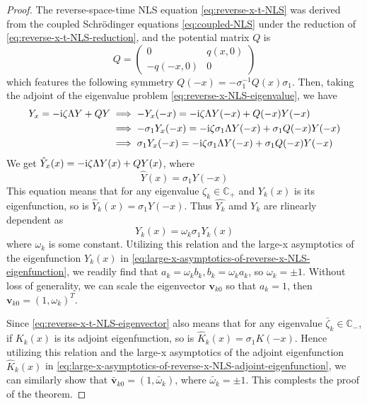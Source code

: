 \begin{proof}
    The reverse-space-time NLS equation \eqref{eq:reverse-x-t-NLS} was derived from the coupled Schrödinger equations \eqref{eq:coupled-NLS} under the reduction of \eqref{eq:reverse-x-t-NLS-reduction}, and the potential matrix $ Q $ is
    \begin{equation}
        Q = \begin{pmatrix}
            0 & q(x,0) \\
            -q(-x,0) & 0
        \end{pmatrix}
    \end{equation}
    which features the following symmetry $ Q(-x) = -\sigma_{1}^{-1}Q(x)\sigma_{1} $. Then, taking the adjoint of the eigenvalue problem \eqref{eq:reverse-x-NLS-eigenvalue}, we have
    \begin{equation}
        \begin{aligned}
        Y_{x} = -\mathrm{i} \zeta \Lambda Y + QY &\implies -Y_{x}(-x) = -\mathrm{i} \zeta \Lambda Y(-x) + Q(-x)Y(-x) \\
        &\implies -\sigma_{1} Y_{x}(-x)= -\mathrm{i} \zeta \sigma_{1}\Lambda Y(-x) + \sigma_{1}Q(-x)Y(-x) \\
        &\implies \sigma_{1}Y_{x}(-x) = -\mathrm{i} \zeta \sigma_{1}\Lambda Y(-x) +\sigma_{1}Q(-x)Y(-x) \\
        \end{aligned}
    \end{equation}
    We get $ \hat{Y}_{x}(x) = -\mathrm{i} \zeta  \Lambda Y(x) + QY(x) $, where
    \begin{equation}
        \hat{Y}(x) = \sigma_{1}Y(-x) \label{eq:reverse-x-t-NLS-eigenvector}
    \end{equation}
    This equation means that for any eigenvalue $ \zeta_{k} \in \mathbb{C}_{+} $ and $ Y_{k}(x) $ is its eigenfunction, so is $ \hat{Y}_{k}(x) = \sigma_{1} Y(-x)$. Thus $ \hat{Y_{k}} $ amd $ Y_{k} $ are rlinearly dependent as 
    \begin{equation}
        Y_{k}(x) = \omega_{k}\sigma_{1}Y_{k}(x)
    \end{equation}
    where $ \omega_{k} $ is some constant. Utilizing this relation and the large-x asymptotics of the eigenfunction $ Y_{k}(x) $ in \eqref{eq:large-x-asymptotics-of-reverse-x-NLS-eigenfunction}, we readily find that $ a_{k} = \omega_{k} b_{k}, b_{k} = \omega_{k} a_{k} $, so $ \omega_{k} = \pm 1 $. Without loss of generality, we can scale the eigenvector $\mathbf{v}_{k0} $ so that $ a_{k} = 1$, then $ \mathbf{v}_{k0} = (1, \omega_{k})^{T} $.

    Since \eqref{eq:reverse-x-t-NLS-eigenvector} also means that for any eigenvalue $ \bar{\zeta}_{k} \in \mathbb{C}_{-} $, if $ K_{k}(x) $ is its adjoint eigenfunction, so is $ \hat{K}_{k}(x) = \sigma_{1} K(-x) $. Hence utilizing this relation and the large-x asymptotics of the adjoint eigenfunction $ \hat{K}_{k}(x) $ in \eqref{eq:large-x-asymptotics-of-reverse-x-NLS-adjoint-eigenfunction}, we can similarly show that $ \bar{\mathbf{v}}_{k0} = (1, \bar{\omega}_{k}) $, where $ \bar{\omega}_{k} = \pm 1 $. This complests the proof of the theorem.
\end{proof}
